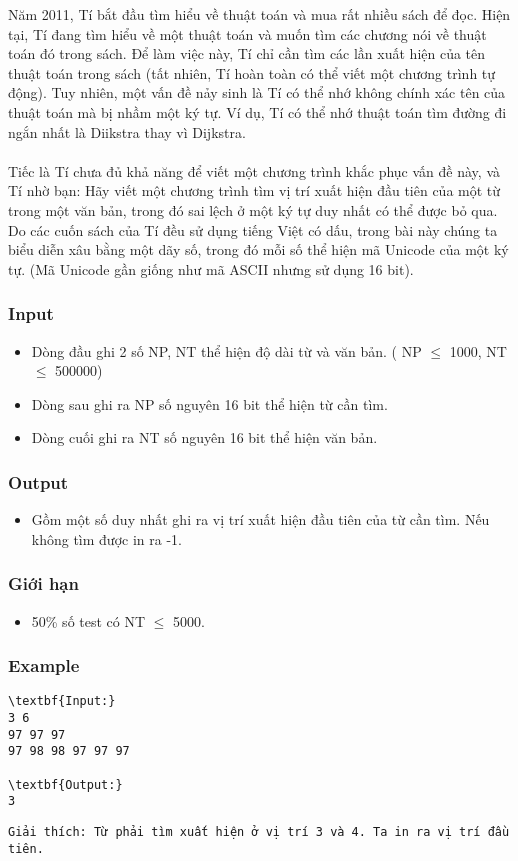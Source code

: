 

Năm 2011, Tí bắt đầu tìm hiểu về thuật toán và mua rất nhiều sách để đọc. Hiện tại, Tí đang tìm hiểu về một thuật toán và muốn tìm các chương nói về thuật toán đó trong sách. Để làm việc này, Tí chỉ cần tìm các lần xuất hiện của tên thuật toán trong sách (tất nhiên, Tí hoàn toàn có thể viết một chương trình tự động). Tuy nhiên, một vấn đề nảy sinh là Tí có thể nhớ không chính xác tên của thuật toán mà bị nhầm một ký tự. Ví dụ, Tí có thể nhớ thuật toán tìm đường đi ngắn nhất là Diikstra thay vì Dijkstra.
\\
\\Tiếc là Tí chưa đủ khả năng để viết một chương trình khắc phục vấn đề này, và Tí nhờ bạn: Hãy viết một chương trình tìm vị trí xuất hiện đầu tiên của một từ trong một văn bản, trong đó sai lệch ở một ký tự duy nhất có thể được bỏ qua. Do các cuốn sách của Tí đều sử dụng tiếng Việt có dấu, trong bài này chúng ta biểu diễn xâu bằng một dãy số, trong đó mỗi số thể hiện mã Unicode của một ký tự. (Mã Unicode gần giống như mã ASCII nhưng sử dụng 16 bit).

\subsubsection{Input}
\begin{itemize}
	\item Dòng đầu ghi 2 số NP, NT thể hiện độ dài từ và văn bản. ( NP  $\le$  1000, NT  $\le$  500000)
\end{itemize}
\begin{itemize}
	\item Dòng sau ghi ra NP số nguyên 16 bit thể hiện từ cần tìm.
\end{itemize}
\begin{itemize}
	\item Dòng cuối ghi ra NT số nguyên 16 bit thể hiện văn bản.
\end{itemize}

\subsubsection{Output}
\begin{itemize}
	\item Gồm một số duy nhất ghi ra vị trí xuất hiện đầu tiên của từ cần tìm. Nếu không tìm được in ra -1.
\end{itemize}

\subsubsection{Giới hạn}
\begin{itemize}
	\item 50\% số test có NT  $\le$  5000.
\end{itemize}

\subsubsection{Example}
\begin{verbatim}
\textbf{Input:}
3 6
97 97 97
97 98 98 97 97 97

\textbf{Output:}
3\end{verbatim}
\begin{verbatim}
Giải thích: Từ phải tìm xuất hiện ở vị trí 3 và 4. Ta in ra vị trí đầu tiên.\end{verbatim}
